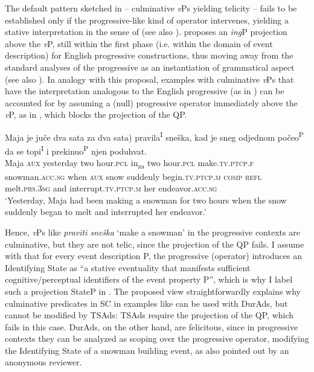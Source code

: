 \documentclass[output=paper,colorlinks,citecolor=brown]{langscibook}
\begin{document}
The default pattern sketched in  -- culminative \textit{v}Ps yielding telicity -- fails to be established only if the progressive-like kind of operator intervenes, yielding a stative interpretation in the sense of \citet{Ramchand2018} (see also \citealt{Parsons1990}). \citet[58--59]{Ramchand2018} proposes an \textit{ing}P projection above the \textit{v}P, still within the first phase (i.e. within the domain of event description) for English progressive constructions, thus moving away from the standard analyses of the progressive as an instantiation of grammatical aspect (see also \citealt{RamchandSvenonius2014, Ramchand2017}). In analogy with this proposal, examples with culminative \textit{v}Ps that have the interpretation analogous to the English progressive (as in ) can be accounted for by assuming a (null) progressive operator immediately above the \textit{v}P, as in , which blocks the projection of the QP. 

\ea \label{mil:ex:progressive-Sneško}
\gll Maja je juče dva sata \minsp{(*} za dva sata) pravila\textsuperscript{I} sneška, kad je sneg odjednom počeo\textsuperscript{P} da se topi\textsuperscript{I} i prekinuo\textsuperscript{P} njen poduhvat. 
\\ Maja \textsc{aux} yesterday two hour.\textsc{pcl} {} in\textsubscript{za} two hour.\textsc{pcl} make.\textsc{tv.ptcp.f} snowman.\textsc{acc.sg} when \textsc{aux} snow suddenly begin.\textsc{tv.ptcp.m} \textsc{comp} \textsc{refl} melt.\textsc{prs.3sg} and interrupt.\textsc{tv.ptcp.m} her endeavor.\textsc{acc.sg}
     \\
\glt  ‘Yesterday, Maja had been making a snowman for two hours when the snow suddenly began to melt and interrupted her endeavor.’
\z

\noindent Hence, \textit{v}Ps like \textit{praviti sneška} ‘make a snowman’ in the progressive contexts are culminative, but they are not telic, since the projection of the QP fails. I assume with \citet[58]{Ramchand2018} that for every event description P, the progressive (operator) introduces an Identifying State as ``a stative eventuality that manifests sufficient cognitive/perceptual identifiers of the event property P'', which is why I label such a projection StateP in . The proposed view straightforwardly explains why culminative predicates in SC in examples like  can be used with DurAds, but cannot be modified by TSAds: TSAds require the projection of the QP, which fails in this case. DurAds, on the other hand, are felicitous, since in progressive contexts they can be analyzed as scoping over the progressive operator, modifying the Identifying State of a snowman building event, as also pointed out by an anonymous reviewer.
\end{document}

